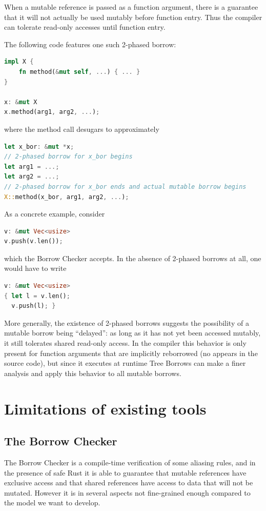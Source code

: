 \documentclass[a4paper,11pt]{article}
\theoremstyle{plain}
\theoremstyle{definition}
\theoremstyle{remark}
\newcommand{\tcode}[1]{\rstinline{#1}}
\begin{document}
When a mutable reference is passed as a function argument, there is a guarantee
that it will not actually be used mutably before function entry. Thus the compiler
can tolerate read-only accesses until function entry.

The following code features one such 2-phased borrow:
\begin{lstlisting}[language=rust]
impl X {
    fn method(&mut self, ...) { ... }
}

x: &mut X
x.method(arg1, arg2, ...);
\end{lstlisting}
where the method call desugars to approximately
\begin{lstlisting}[language=rust]
let x_bor: &mut *x;
// 2-phased borrow for x_bor begins
let arg1 = ...;
let arg2 = ...;
// 2-phased borrow for x_bor ends and actual mutable borrow begins
X::method(x_bor, arg1, arg2, ...);
\end{lstlisting}

As a concrete example, consider
\begin{lstlisting}[language=rust]
v: &mut Vec<usize>
v.push(v.len());
\end{lstlisting}
which the Borrow Checker accepts.
In the absence of 2-phased borrows at all, one would have to write
\begin{lstlisting}[language=rust]
v: &mut Vec<usize>
{ let l = v.len();
  v.push(l); }
\end{lstlisting}

More generally, the existence of 2-phased borrows suggests the possibility of a mutable
borrow being ``delayed'': as long as it has not yet been accessed mutably, it still
tolerates shared read-only access.
In the compiler this behavior is only present for function arguments that are
implicitly reborrowed (no \tcode{\&mut} appears in the source code), but since it
executes at runtime Tree Borrows can make a finer analysis and apply this behavior
to all mutable borrows.


\section{Limitations of existing tools}

\subsection{The Borrow Checker}

The Borrow Checker is a compile-time verification of some aliasing rules, and
in the presence of safe Rust it is able to guarantee that mutable references
have exclusive access and that shared references have access to data that will
not be mutated. However it is in several aspects not fine-grained enough compared
to the model we want to develop.
\end{document}
